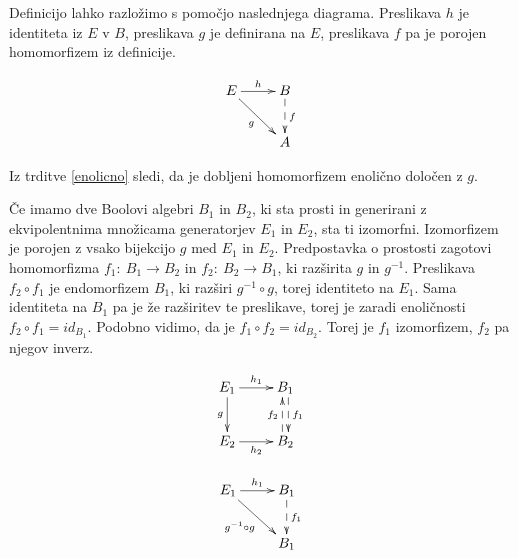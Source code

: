 \documentclass{amsart}
\begin{document}
Definicijo lahko razložimo s pomočjo naslednjega diagrama. Preslikava $h$ je identiteta iz $E$ v $B$,
preslikava $g$ je definirana na $E$, preslikava $f$ pa je porojen homomorfizem
iz definicije.

\begin{equation*}
  \xymatrix{
    {E}
    \ar[r]^{h}
    \ar[dr]_{g}
    &
    {B}
    \ar@{-->}[d]^f
    \\
    &
    {A}
  }
\end{equation*}

Iz trditve \ref{enolicno} sledi, da je dobljeni homomorfizem enolično
določen z $g$.

Če imamo dve Boolovi algebri $B_1$ in $B_2$, ki sta prosti in generirani
z ekvipolentnima množicama generatorjev $E_1$ in $E_2$,
sta ti izomorfni. Izomorfizem 
je porojen z vsako bijekcijo $g$ med $E_1$ in $E_2$.
Predpostavka o prostosti zagotovi homomorfizma \(f_1:~B_1 \to B_2\) in \(f_2:~B_2 \to B_1\),
ki razširita \(g\) in \(g^{-1}\). Preslikava \(f_2 \circ f_1\) je endomorfizem
$B_1$, ki razširi \(g^{-1} \circ g\), torej identiteto na $E_1$. Sama identiteta na $B_1$ 
pa je že razširitev te preslikave, torej je zaradi enoličnosti
\(f_2 \circ f_1 = id_{B_1}\). Podobno vidimo, da je \(f_1 \circ f_2 = id_{B_2}\).
Torej je \(f_1\) izomorfizem, \(f_2\) pa njegov inverz.



\begin{table*}[!htb]
    \begin{minipage}{.5\linewidth}
      \centering
        \begin{equation*}
            \xymatrix{
            {E_1}
            \ar[r]^{h_1}
            \ar@{->}[d]_{g}
            &
            {B_1}
            \ar@<0.5ex>@{-->}[d]^{f_1}
            \\
            {E_2}
            \ar[r]_{h_2}
            &
            {B_2}   
            \ar@<0.5ex>@{-->}[u]^{f_2}
            }
        \end{equation*}
    \end{minipage}%
    \begin{minipage}{.5\linewidth}
      \centering
        \begin{equation*}
            \xymatrix{
              {E_1}
              \ar[r]^{h_1}
              \ar@{->}[dr]_{g^{-1} \circ g}
              &
              {B_1}
              \ar@{-->}[d]^{f_1}
              \\
              &
              {B_1}      
            }
        \end{equation*}
    \end{minipage} 
\end{table*}
\end{document}
